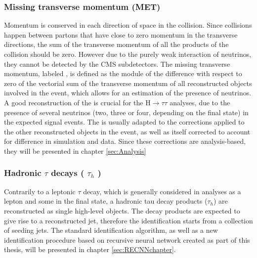 \subsubsection{Missing transverse momentum (MET)}
Momentum is conserved in each direction of space in the collision. Since collisions happen between partons that have close to zero momentum in the transverse directions, the sum of the transverse momentum of all the products of the collision should be zero. However due to the purely weak interaction of neutrinos, they cannot be detected by the CMS subdetectors. The missing transverse momentum, labeled \ETm, is defined as the module of the difference with respect to zero of the vectorial sum of the transverse momentum of all reconstructed objects involved in the event, which allows for an estimation of the presence of neutrinos. A good reconstruction of the \ETm is crucial for the H$\rightarrow\tau\tau$ analyses, due to the presence of several neutrinos (two, three or four, depending on the final state) in the expected signal events. The \ETm is usually adapted to the corrections applied to the other reconstructed objects in the event, as well as itself corrected to account for difference in simulation and data. Since these corrections are analysis-based, they will be presented in chapter \ref{sec:Analysis}

\subsubsection{Hadronic $\tau$ decays ( $\tau_{h}$ )}
Contrarily to a leptonic $\tau$ decay, which is generally considered in analyses as a lepton and some \ETm in the final state, a hadronic tau decay products ($\tau_{h}$) are reconstructed as single high-level objects. The \tauh decay products are expected to give rise to a reconstructed jet, therefore the \tauh identification starts from a collection of seeding jets. The standard \tauh identification algorithm, as well as a new identification procedure based on recursive neural network created as part of this thesis, will be presented in chapter \ref{sec:RECNNchapter}.
